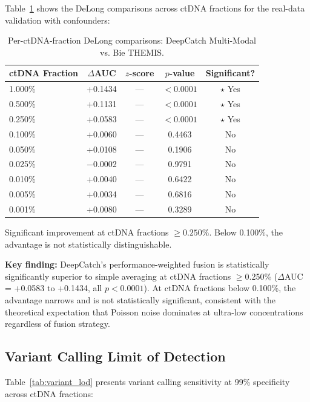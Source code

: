 \documentclass[10pt,a4paper]{article}
\begin{document}
Table~\ref{tab:delong_ctdna} shows the DeLong comparisons across ctDNA fractions for the real-data validation with confounders:

\begin{table}[H]
\centering
\caption{Per-ctDNA-fraction DeLong comparisons: DeepCatch Multi-Modal vs. Bie THEMIS.}
\label{tab:delong_ctdna}
\begin{tabular}{l c c c c}
\toprule
\textbf{ctDNA Fraction} & \textbf{$\Delta$AUC} & \textbf{$z$-score} & \textbf{$p$-value} & \textbf{Significant?} \\
\midrule
1.000\% & +0.1434 & — & $< 0.0001$ & $\star$ Yes \\
0.500\% & +0.1131 & — & $< 0.0001$ & $\star$ Yes \\
0.250\% & +0.0583 & — & $< 0.0001$ & $\star$ Yes \\
0.100\% & +0.0060 & — & 0.4463 & No \\
0.050\% & +0.0108 & — & 0.1906 & No \\
0.025\% & $-$0.0002 & — & 0.9791 & No \\
0.010\% & +0.0040 & — & 0.6422 & No \\
0.005\% & +0.0034 & — & 0.6816 & No \\
0.001\% & +0.0080 & — & 0.3289 & No \\
\bottomrule
\end{tabular}
\vspace{0.3cm}
\footnotesize{Significant improvement at ctDNA fractions $\geq 0.250\%$. Below 0.100\%, the advantage is not statistically distinguishable.}
\end{table}

\textbf{Key finding:} DeepCatch's performance-weighted fusion is statistically significantly superior to simple averaging at ctDNA fractions $\geq$0.250\% ($\Delta$AUC = +0.0583 to +0.1434, all $p < 0.0001$). At ctDNA fractions below 0.100\%, the advantage narrows and is not statistically significant, consistent with the theoretical expectation that Poisson noise dominates at ultra-low concentrations regardless of fusion strategy.

\subsection{Variant Calling Limit of Detection}

Table~\ref{tab:variant_lod} presents variant calling sensitivity at 99\% specificity across ctDNA fractions:
\end{document}
